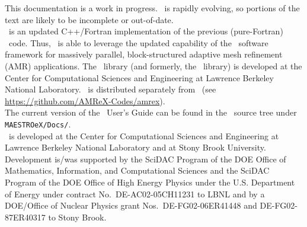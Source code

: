 This documentation is a work in progress.  \maestroex\ is rapidly evolving, so portions of 
the text are likely to be incomplete or out-of-date. \\

\maestroex\ is an updated C++/Fortran implementation of the previous (pure-Fortran) 
\maestro\ code.  Thus, \maestroex\ is able to leverage the updated capability of the 
\amrex\ software  framework for massively parallel, block-structured adaptive mesh 
refinement (AMR) applications.  The \amrex\ library (and formerly, the \boxlib\ library) 
is developed at the Center for Computational Sciences and Engineering at Lawrence Berkeley 
National Laboratory.  \amrex\ is distributed separately from \maestroex\ 
(see \url{https://github.com/AMReX-Codes/amrex}). \\

\noindent The current version of the \maestroex\ User's Guide can be found in 
the \maestroex\ source tree under {\tt MAESTROeX/Docs/}.\\

\noindent \maestroex\ is developed at the Center for Computational Sciences and
Engineering at Lawrence Berkeley National Laboratory and at Stony
Brook University.  Development is/was supported by the SciDAC Program of
the DOE Office of Mathematics, Information, and Computational Sciences
and the SciDAC Program of the DOE Office of High Energy Physics under
the U.S. Department of Energy under contract No.\ DE-AC02-05CH11231 to
LBNL and by a DOE/Office of Nuclear Physics grant Nos.\
DE-FG02-06ER41448 and DE-FG02-87ER40317 to Stony Brook.  \\

